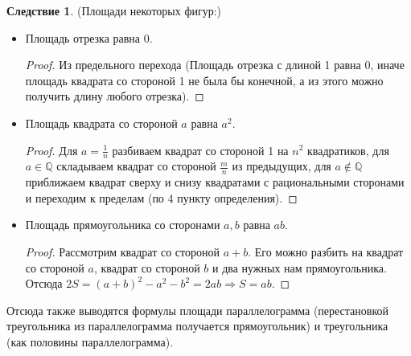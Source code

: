 \documentclass[a4paper, 12pt]{article}
\theoremstyle{definition}
\newtheorem*{consequense}{Следствие}
\begin{document}
	\begin{consequense}(Площади некоторых фигур:)
		\begin{itemize}
			\item Площадь отрезка равна 0.
			\begin{proof}
				Из предельного перехода (Площадь отрезка с длиной 1 равна 0, иначе площадь квадрата со стороной 1 не была бы конечной, а из этого можно получить длину любого отрезка).
			\end{proof}
			\item Площадь квадрата со стороной $a$ равна $a^2$.
			\begin{proof}
				Для $a = \frac{1}{n}$ разбиваем квадрат со стороной 1 на $n^2$ квадратиков, для $a \in \mathbb{Q}$ складываем квадрат со стороной $\frac{m}{n}$ из предыдущих, для $a \notin \mathbb{Q}$ приближаем квадрат сверху и снизу квадратами с рациональными сторонами и переходим к пределам (по 4 пункту определения).
			\end{proof}
			\item Площадь прямоугольника со сторонами $a, b$ равна $ab$.
			\begin{proof}
				Рассмотрим квадрат со стороной $a+b$. Его можно разбить на квадрат со стороной $a$, квадрат со стороной $b$ и два нужных нам прямоугольника. Отсюда $2S = (a+b)^2 - a^2 -b^2 = 2ab \Rightarrow S = ab$.
			\end{proof} 
		\end{itemize}
		Отсюда также выводятся формулы площади параллелограмма (перестановкой треугольника из параллелограмма получается прямоугольник) и треугольника (как половины параллелограмма).
	\end{consequense}
\end{document}
